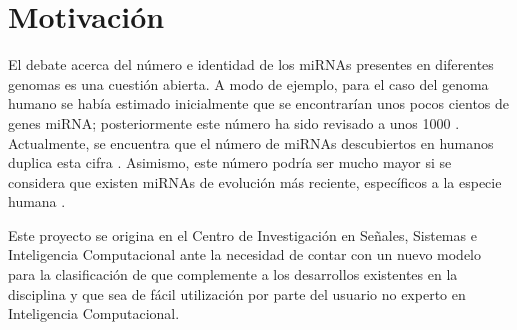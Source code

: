 %
%
%
\section{Motivación}
%
El debate acerca del número e identidad de los miRNAs presentes en
diferentes genomas es una cuestión abierta.
A modo de ejemplo, para el caso del genoma humano se había estimado
inicialmente que se encontrarían unos pocos cientos de genes miRNA;
posteriormente este número ha sido revisado a unos 1000
\cite{sewer,chang}.
Actualmente, se encuentra que el número de miRNAs descubiertos en
humanos duplica esta cifra \cite{gomes}.
Asimismo, este número podría ser mucho mayor si se considera que
existen miRNAs de evolución más reciente, específicos a la especie
humana \cite{sewer}.

Este proyecto se origina en el Centro de Investigación en Señales, 
Sistemas e Inteligencia Computacional  ante la necesidad de
contar con un nuevo modelo para la clasificación de  que
complemente a los desarrollos existentes en la disciplina y que sea
de fácil utilización por parte del usuario no experto en Inteligencia
Computacional.

